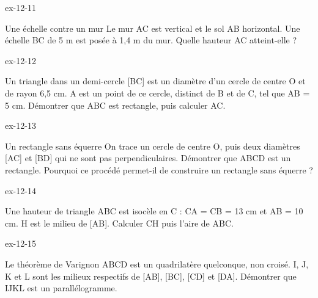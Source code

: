 \clearpage{}
\begin{blocLivre}{ex-12-11}\begin{exercice}[3]{Une échelle contre un mur}
Le mur AC est vertical et le sol AB horizontal. Une échelle BC de 5 m est posée à 1,4 m du mur. Quelle hauteur AC atteint-elle ?
\label{fig-ex-12-11}
\end{exercice}\end{blocLivre}
\begin{blocLivre}{ex-12-12}\begin{exercice}[3]{Un triangle dans un demi-cercle}
[BC] est un diamètre d’un cercle de centre O et de rayon 6,5 cm. A est un point de ce cercle, distinct de B et de C, tel que AB = 5 cm. Démontrer que ABC est rectangle, puis calculer AC.
\label{fig-ex-12-12}
\end{exercice}\end{blocLivre}
\begin{blocLivre}{ex-12-13}\begin{exercice}[3]{Un rectangle sans équerre}
On trace un cercle de centre O, puis deux diamètres [AC] et [BD] qui ne sont pas perpendiculaires. Démontrer que ABCD est un rectangle. Pourquoi ce procédé permet-il de construire un rectangle sans équerre ?
\label{fig-ex-12-13}
\end{exercice}\end{blocLivre}
\begin{blocLivre}{ex-12-14}\begin{exercice}[3]{Une hauteur de triangle}
ABC est isocèle en C : CA = CB = 13 cm et AB = 10 cm. H est le milieu de [AB]. Calculer CH puis l’aire de ABC.
\label{fig-ex-12-14}
\end{exercice}\end{blocLivre}
\begin{blocLivre}{ex-12-15}\begin{exercice}[3]{Le théorème de Varignon}
ABCD est un quadrilatère quelconque, non croisé. I, J, K et L sont les milieux respectifs de [AB], [BC], [CD] et [DA]. Démontrer que IJKL est un parallélogramme.
\label{fig-ex-12-15}
\end{exercice}\end{blocLivre}

\clearpage
